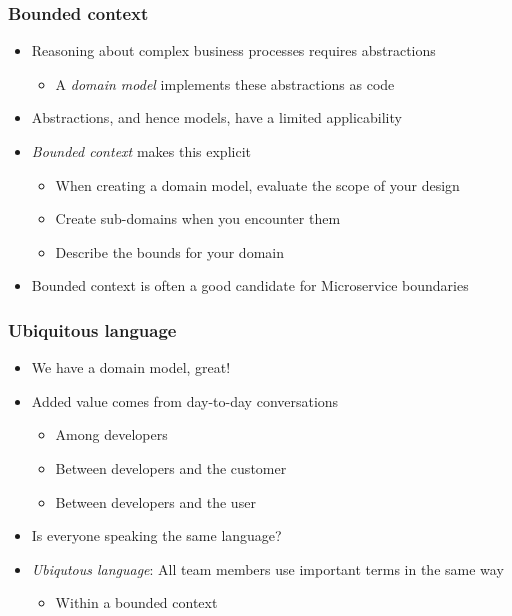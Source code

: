 \documentclass[8pt]{article}
\begin{document}
\subsubsection{Bounded context}
\label{sec:orgcea643c}
\begin{itemize}
\item Reasoning about complex business processes requires abstractions
\begin{itemize}
\item A \emph{domain model} implements these abstractions as code
\end{itemize}
\item Abstractions, and hence models, have a limited applicability
\item \emph{Bounded context} makes this explicit
\begin{itemize}
\item When creating a domain model, evaluate the scope of your design
\item Create sub-domains when you encounter them
\item Describe the bounds for your domain
\end{itemize}

\item Bounded context is often a good candidate for Microservice boundaries
\end{itemize}
\subsubsection{Ubiquitous language}
\label{sec:org160b515}
\begin{itemize}
\item We have a domain model, great!
\item Added value comes from day-to-day conversations
\begin{itemize}
\item Among developers
\item Between developers and the customer
\item Between developers and the user
\end{itemize}
\item Is everyone speaking the same language?

\item \emph{Ubiqutous language}: All team members use important terms in the same way
\begin{itemize}
\item Within a bounded context
\end{itemize}
\end{itemize}
\end{document}
